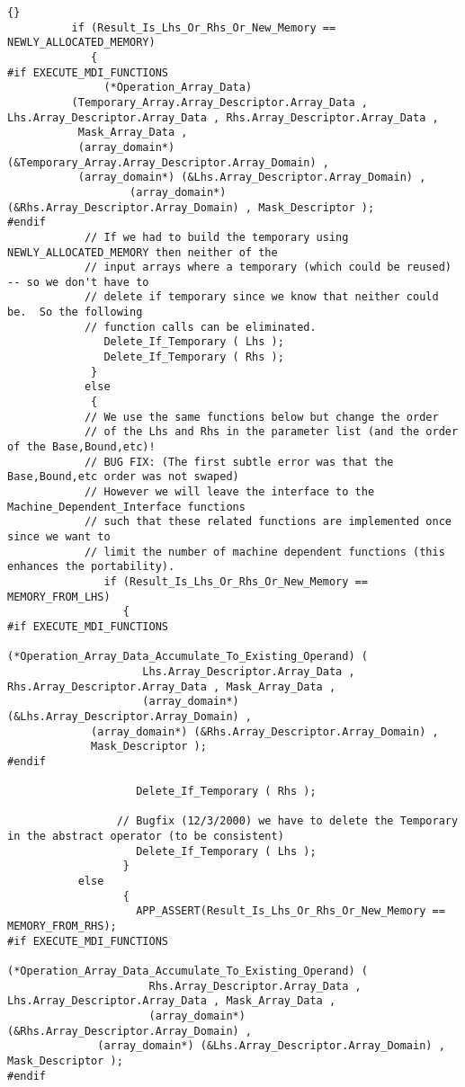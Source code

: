 \documentclass[10pt]{llncs}
\begin{document}
\begin{lstlisting}{}
          if (Result_Is_Lhs_Or_Rhs_Or_New_Memory == NEWLY_ALLOCATED_MEMORY) 
             {
#if EXECUTE_MDI_FUNCTIONS
               (*Operation_Array_Data) 
		  (Temporary_Array.Array_Descriptor.Array_Data , Lhs.Array_Descriptor.Array_Data , Rhs.Array_Descriptor.Array_Data , 
		   Mask_Array_Data , 
		   (array_domain*) (&Temporary_Array.Array_Descriptor.Array_Domain) , 
		   (array_domain*) (&Lhs.Array_Descriptor.Array_Domain) ,
                   (array_domain*) (&Rhs.Array_Descriptor.Array_Domain) , Mask_Descriptor );
#endif
            // If we had to build the temporary using NEWLY_ALLOCATED_MEMORY then neither of the
            // input arrays where a temporary (which could be reused) -- so we don't have to
            // delete if temporary since we know that neither could be.  So the following
            // function calls can be eliminated.
               Delete_If_Temporary ( Lhs );
               Delete_If_Temporary ( Rhs );
             }
            else
             {
            // We use the same functions below but change the order 
            // of the Lhs and Rhs in the parameter list (and the order of the Base,Bound,etc)!
            // BUG FIX: (The first subtle error was that the Base,Bound,etc order was not swaped)
            // However we will leave the interface to the Machine_Dependent_Interface functions
            // such that these related functions are implemented once since we want to
            // limit the number of machine dependent functions (this enhances the portability).
               if (Result_Is_Lhs_Or_Rhs_Or_New_Memory == MEMORY_FROM_LHS) 
                  {
#if EXECUTE_MDI_FUNCTIONS
                    (*Operation_Array_Data_Accumulate_To_Existing_Operand) (
                     Lhs.Array_Descriptor.Array_Data , Rhs.Array_Descriptor.Array_Data , Mask_Array_Data ,
                     (array_domain*) (&Lhs.Array_Descriptor.Array_Domain) , 
		     (array_domain*) (&Rhs.Array_Descriptor.Array_Domain) , 
		     Mask_Descriptor );
#endif

                    Delete_If_Temporary ( Rhs );

                 // Bugfix (12/3/2000) we have to delete the Temporary in the abstract operator (to be consistent)
                    Delete_If_Temporary ( Lhs );
                  }
	       else
                  {
                    APP_ASSERT(Result_Is_Lhs_Or_Rhs_Or_New_Memory == MEMORY_FROM_RHS);
#if EXECUTE_MDI_FUNCTIONS
                    (*Operation_Array_Data_Accumulate_To_Existing_Operand) (
                      Rhs.Array_Descriptor.Array_Data , Lhs.Array_Descriptor.Array_Data , Mask_Array_Data ,
                      (array_domain*) (&Rhs.Array_Descriptor.Array_Domain) , 
		      (array_domain*) (&Lhs.Array_Descriptor.Array_Domain) , Mask_Descriptor );
#endif


\end{lstlisting}
\end{document}

